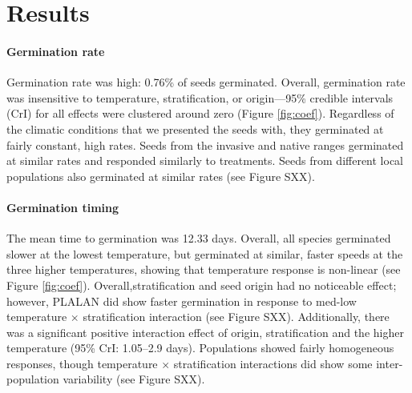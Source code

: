 \documentclass[12pt]{article}\usepackage[]{graphicx}\usepackage[]{color}
\begin{document}
	\section{Results}
	\paragraph{Germination rate} Germination rate was high: 0.76\% of seeds germinated. Overall, germination rate was insensitive to temperature, stratification, or origin---95\% credible intervals (CrI) for all effects were clustered around zero (Figure \ref{fig:coef}). Regardless of the climatic conditions that we presented the seeds with, they germinated at fairly constant, high rates. Seeds from the invasive and native ranges germinated at similar rates and responded similarly to treatments. Seeds from different local populations also germinated at similar rates (see Figure SXX).
	\paragraph{Germination timing} The mean time to germination was 12.33 days.  Overall, all species germinated slower at the lowest temperature, but germinated at similar, faster speeds at the three higher temperatures, showing that temperature response is non-linear  (see Figure \ref{fig:coef}). Overall,stratification and seed origin had no noticeable effect; however, PLALAN did show faster germination in response to med-low temperature $\times$ stratification interaction (see Figure SXX).  Additionally, there was a significant positive interaction effect of origin, stratification and the higher temperature (95\% CrI: 1.05--2.9 days). Populations showed fairly homogeneous responses, though temperature $\times$ stratification interactions did show some inter-population variability (see Figure SXX). 
	
\end{document}
